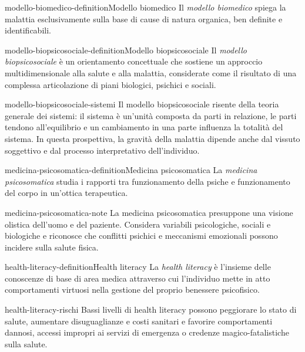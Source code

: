 \documentclass[preview]{standalone}
\begin{document}
\begin{snippetdefinition}{modello-biomedico-definition}{Modello biomedico}
    Il \emph{modello biomedico} spiega la malattia esclusivamente sulla base di
    cause di natura organica, ben definite e identificabili.
\end{snippetdefinition}

\begin{snippetdefinition}{modello-biopsicosociale-definition}{Modello biopsicosociale}
    Il \emph{modello biopsicosociale} è un orientamento concettuale che sostiene
    un approccio multidimensionale alla salute e alla malattia, considerate come
    il risultato di una complessa articolazione di piani biologici, psichici e
    sociali.
\end{snippetdefinition}


\begin{snippet}{modello-biopsicosociale-sistemi}
    Il modello biopsicosociale risente della teoria generale dei sistemi: il
    sistema è un'unità composta da parti in relazione, le parti tendono
    all'equilibrio e un cambiamento in una parte influenza la totalità del
    sistema. In questa prospettiva, la gravità della malattia dipende anche dal
    vissuto soggettivo e dal processo interpretativo dell'individuo.
\end{snippet}

\begin{snippetdefinition}{medicina-psicosomatica-definition}{Medicina psicosomatica}
    La \emph{medicina psicosomatica} studia i rapporti tra funzionamento della
    psiche e funzionamento del corpo in un'ottica terapeutica.
\end{snippetdefinition}

\begin{snippet}{medicina-psicosomatica-note}
    La medicina psicosomatica presuppone una visione olistica dell'uomo e del
    paziente. Considera variabili psicologiche, sociali e biologiche e riconosce
    che conflitti psichici e meccanismi emozionali possono incidere sulla salute
    fisica.
\end{snippet}

\begin{snippetdefinition}{health-literacy-definition}{Health literacy}
    La \emph{health literacy} è l'insieme delle conoscenze di base di area
    medica attraverso cui l'individuo mette in atto comportamenti virtuosi nella
    gestione del proprio benessere psicofisico.
\end{snippetdefinition}

\begin{snippet}{health-literacy-rischi}
    Bassi livelli di health literacy possono peggiorare lo stato di salute,
    aumentare disuguaglianze e costi sanitari e favorire comportamenti dannosi,
    accessi impropri ai servizi di emergenza o credenze magico-fatalistiche
    sulla salute.
\end{snippet}
\end{document}
